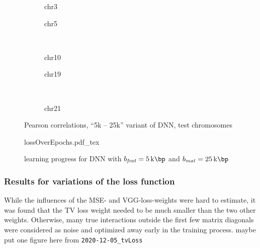 \begin{figure}[p]
    \begin{subfigure}{0.45\textwidth}
        \scriptsize
        \caption{chr3}
    \end{subfigure} \hfill
    \begin{subfigure}{0.45\textwidth}
        \scriptsize
        \caption{chr5}
    \end{subfigure}\\[5mm]
    \begin{subfigure}{0.45\textwidth}
        \scriptsize
        \caption{chr10}
    \end{subfigure}\hfill
    \begin{subfigure}{0.45\textwidth}
        \scriptsize
        \caption{chr19}
    \end{subfigure}\\[3mm]
    \centering
    \begin{subfigure}{0.45\textwidth}
        \scriptsize
        \caption{chr21}
    \end{subfigure}
    \caption{Pearson correlations, ``5k -- 25k'' variant of DNN,  test chromosomes}
    \label{fig:results:25k5DNN_pearson}
\end{figure}
\begin{figure}[hbp]
 \centering
 \scriptsize
 {lossOverEpochs.pdf_tex}
 \caption{learning progress for DNN with $b_\mathit{feat}=\SI{5}{\kilo\bp}$ and $b_\mathit{mat}=\SI{25}{\kilo\bp}$} \label{fig:results:25k5DNN_lossEpochs}
\end{figure}

\subsubsection{Results for variations of the loss function} \label{sec:results:loss_functions}

While the influences of the MSE- and VGG-loss-weights were hard to estimate, 
it was found that the TV loss weight needed to be much smaller than the two other weights.
Otherwise, many true interactions outside the first few matrix diagonals were considered as noise and optimized away early in the training process.
\xxx maybe put one figure here from \texttt{2020-12-05\_tvLoss}

